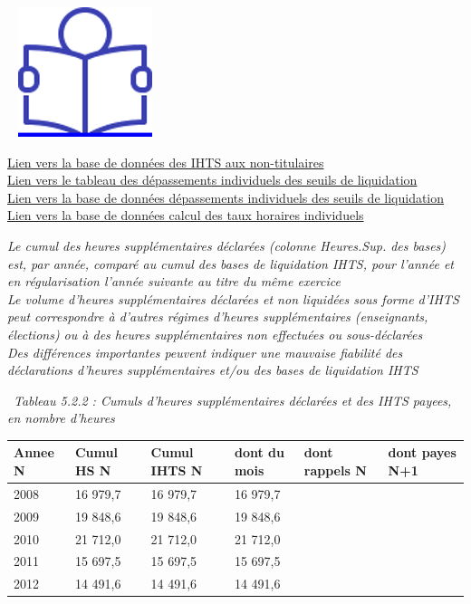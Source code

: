 ~
\href{../Docs/Notices/fiche_liquidation_IHTS.odt}{\includegraphics{icones/Notice.png}}

\href{../Bases/Reglementation/Base.IHTS.non.tit.csv}{Lien vers la base de
données des IHTS aux non-titulaires}\\
\href{../Bases/Reglementation/depassement.agent.annee.csv}{Lien vers le
tableau des dépassements individuels des seuils de liquidation}\\
\href{../Bases/Reglementation/depassement.agent.csv}{Lien vers la base de
données dépassements individuels des seuils de liquidation}\\
\href{../Bases/Reglementation/Taux.horaires.csv}{Lien vers la base de
données calcul des taux horaires individuels}

\emph{Le cumul des heures supplémentaires déclarées (colonne Heures.Sup.
des bases) est, par année, comparé au cumul des bases de liquidation
IHTS, pour l'année et en régularisation l'année suivante au titre du
même exercice}\\
\emph{Le volume d'heures supplémentaires déclarées et non liquidées sous
forme d'IHTS peut correspondre à d'autres régimes d'heures
supplémentaires (enseignants, élections) ou à des heures supplémentaires
non effectuées ou sous-déclarées}\\
\emph{Des différences importantes peuvent indiquer une mauvaise
fiabilité des déclarations d'heures supplémentaires et/ou des bases de
liquidation IHTS}

~\emph{Tableau 5.2.2 : Cumuls d'heures supplémentaires déclarées et des
IHTS payees, en nombre d'heures}

\begin{longtable}[]{@{}llllll@{}}
\toprule
Annee N & Cumul HS N & Cumul IHTS N & dont du mois & dont rappels N &
dont payes N+1\tabularnewline
\midrule
\endhead
2008 & 16 979,7 & 16 979,7 & 16 979,7 & &\tabularnewline
2009 & 19 848,6 & 19 848,6 & 19 848,6 & &\tabularnewline
2010 & 21 712,0 & 21 712,0 & 21 712,0 & &\tabularnewline
2011 & 15 697,5 & 15 697,5 & 15 697,5 & &\tabularnewline
2012 & 14 491,6 & 14 491,6 & 14 491,6 & &\tabularnewline
\bottomrule
\end{longtable}

